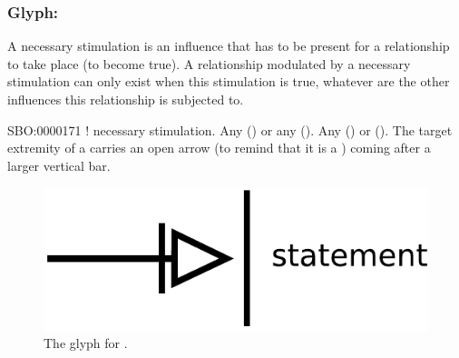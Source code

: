 \color{ForestGreen}

\subsubsection{Glyph: }\label{sec:necessaryStimulation}

A necessary stimulation is an influence that has to be present for a relationship to take place (to become true). A relationship modulated by a necessary stimulation can only exist when this stimulation is true, whatever are the other influences this relationship is subjected to.

\begin{glyphDescription}
 \glyphSboTerm SBO:0000171 ! necessary stimulation.
 \glyphOrigin Any  () or any  ().
 \glyphTarget Any  () or  ().
 \glyphEndPoint The target extremity of a  carries an open arrow (to remind that it is a ) coming after a larger vertical bar.
 \end{glyphDescription}

\begin{figure}[H]
  \centering
  \includegraphics[scale = 0.5]{images/necessaryStimulation}
  \caption{The \PD glyph for .}
  \label{fig:necessaryStimulation}
\end{figure}

